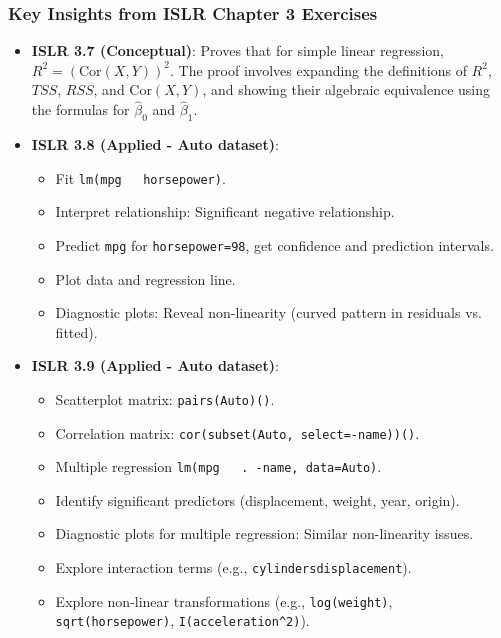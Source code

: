 \documentclass[12pt,a4paper]{article}
\newcommand{\Rfunction}[1]{\texttt{#1()}} %
\newcommand{\Robject}[1]{\texttt{#1}} %
\newcommand{\Rcode}[1]{\texttt{#1}} %
\begin{document}
\begin{itemize}
    \subsubsection{Key Insights from ISLR Chapter 3 Exercises}
        \begin{itemize}
            \item \textbf{ISLR 3.7 (Conceptual)}: Proves that for simple linear regression, $R^2 = (\text{Cor}(X,Y))^2$. The proof involves expanding the definitions of $R^2$, $TSS$, $RSS$, and $\text{Cor}(X,Y)$, and showing their algebraic equivalence using the formulas for $\hat{\beta}_0$ and $\hat{\beta}_1$.
            \item \textbf{ISLR 3.8 (Applied - Auto dataset)}:
                \begin{itemize}
                    \item Fit \Rcode{lm(mpg ~ horsepower)}.
                    \item Interpret relationship: Significant negative relationship.
                    \item Predict \Robject{mpg} for \Robject{horsepower=98}, get confidence and prediction intervals.
                    \item Plot data and regression line.
                    \item Diagnostic plots: Reveal non-linearity (curved pattern in residuals vs. fitted).
                \end{itemize}
            \item \textbf{ISLR 3.9 (Applied - Auto dataset)}:
                \begin{itemize}
                    \item Scatterplot matrix: \Rfunction{pairs(Auto)}.
                    \item Correlation matrix: \Rfunction{cor(subset(Auto, select=-name))}.
                    \item Multiple regression \Rcode{lm(mpg ~ . -name, data=Auto)}.
                    \item Identify significant predictors (displacement, weight, year, origin).
                    \item Diagnostic plots for multiple regression: Similar non-linearity issues.
                    \item Explore interaction terms (e.g., \Rcode{cylindersdisplacement}).
                    \item Explore non-linear transformations (e.g., \Rcode{log(weight)}, \Rcode{sqrt(horsepower)}, \Rcode{I(acceleration\textasciicircum{}2)}).

\end{itemize}
\end{itemize}
\end{itemize}
\end{document}
